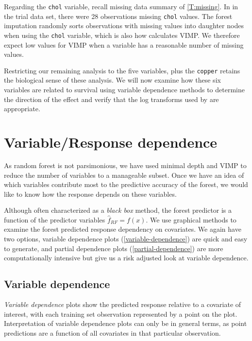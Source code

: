 \documentclass[article]{jss}
\begin{document}
Regarding the \texttt{chol} variable, recall missing data summary of
\autoref{T:missing}. In in the trial data set, there were 28
observations missing \texttt{chol} values. The forest imputation
randomly sorts observations with missing values into daughter nodes when
using the \texttt{chol} variable, which is also how
 calculates VIMP. We therefore expect low values
for VIMP when a variable has a reasonable number of missing values.

Restricting our remaining analysis to the five\citep{fleming:1991}
variables, plus the \texttt{copper} retains the biological sense of
these analysis. We will now examine how these six variables are related
to survival using variable dependence methods to determine the direction
of the effect and verify that the log transforms used
by\citep{fleming:1991} are appropriate.

\section{Variable/Response
dependence}\label{variableresponse-dependence}

As random forest is not parsimonious, we have used minimal depth and
VIMP to reduce the number of variables to a manageable subset. Once we
have an idea of which variables contribute most to the predictive
accuracy of the forest, we would like to know how the response depends
on these variables.

Although often characterized as a \emph{black box} method, the forest
predictor is a function of the predictor variables
\(\hat{f}_{RF} = f(x).\) We use graphical methods to examine the forest
predicted response dependency on covariates. We again have two options,
variable dependence plots (\autoref{variable-dependence}) are quick and
easy to generate, and partial dependence plots
(\autoref{partial-dependence}) are more computationally intensive but
give us a risk adjusted look at variable dependence.

\subsection{Variable dependence}\label{variable-dependence}

\emph{Variable dependence} plots show the predicted response relative to
a covariate of interest, with each training set observation represented
by a point on the plot. Interpretation of variable dependence plots can
only be in general terms, as point predictions are a function of all
covariates in that particular observation.
\end{document}
